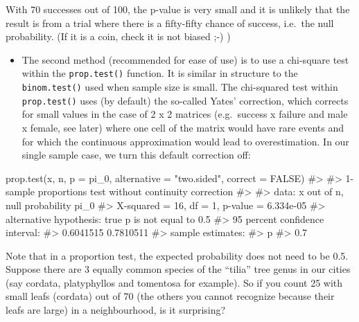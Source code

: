 \documentclass[
  letterpaper,
  DIV=11,
  numbers=noendperiod]{scrreprt}
\newenvironment{Shaded}{\begin{snugshade}}{\end{snugshade}}
\newcommand{\AttributeTok}[1]{\textcolor[rgb]{0.40,0.45,0.13}{#1}}
\newcommand{\CommentTok}[1]{\textcolor[rgb]{0.37,0.37,0.37}{#1}}
\newcommand{\ConstantTok}[1]{\textcolor[rgb]{0.56,0.35,0.01}{#1}}
\newcommand{\FunctionTok}[1]{\textcolor[rgb]{0.28,0.35,0.67}{#1}}
\newcommand{\NormalTok}[1]{\textcolor[rgb]{0.00,0.23,0.31}{#1}}
\newcommand{\StringTok}[1]{\textcolor[rgb]{0.13,0.47,0.30}{#1}}
\providecommand{\tightlist}{%
  \setlength{\itemsep}{0pt}\setlength{\parskip}{0pt}}\usepackage{longtable,booktabs,array}
\begin{document}
With 70 successes out of 100, the p-value is very small and it is
unlikely that the result is from a trial where there is a fifty-fifty
chance of success, i.e.~the null probability. (If it is a coin, check it
is not biased ;-) )

\begin{itemize}
\tightlist
\item
  The second method (recommended for ease of use) is to use a chi-square
  test within the \texttt{prop.test()} function. It is similar in
  structure to the \texttt{binom.test()} used when sample size is small.
  The chi-squared test within \texttt{prop.test()} uses (by default) the
  so-called Yates' correction, which corrects for small values in the
  case of 2 x 2 matrices (e.g.~success x failure and male x female, see
  later) where one cell of the matrix would have rare events and for
  which the continuous approximation would lead to overestimation. In
  our single sample case, we turn this default correction off:
\end{itemize}

\begin{Shaded}
\begin{Highlighting}[]
\FunctionTok{prop.test}\NormalTok{(x, n, }\AttributeTok{p =}\NormalTok{ pi\_0, }\AttributeTok{alternative =} \StringTok{"two.sided"}\NormalTok{, }\AttributeTok{correct =} \ConstantTok{FALSE}\NormalTok{)}
\CommentTok{\#\textgreater{} }
\CommentTok{\#\textgreater{}  1{-}sample proportions test without continuity correction}
\CommentTok{\#\textgreater{} }
\CommentTok{\#\textgreater{} data:  x out of n, null probability pi\_0}
\CommentTok{\#\textgreater{} X{-}squared = 16, df = 1, p{-}value = 6.334e{-}05}
\CommentTok{\#\textgreater{} alternative hypothesis: true p is not equal to 0.5}
\CommentTok{\#\textgreater{} 95 percent confidence interval:}
\CommentTok{\#\textgreater{}  0.6041515 0.7810511}
\CommentTok{\#\textgreater{} sample estimates:}
\CommentTok{\#\textgreater{}   p }
\CommentTok{\#\textgreater{} 0.7}
\end{Highlighting}
\end{Shaded}

Note that in a proportion test, the expected probability does not need
to be 0.5. Suppose there are 3 equally common species of the ``tilia''
tree genus in our cities (say cordata, platyphyllos and tomentosa for
example). So if you count 25 with small leafs (cordata) out of 70 (the
others you cannot recognize because their leafs are large) in a
neighbourhood, is it surprising?
\end{document}
